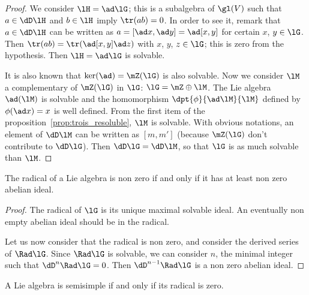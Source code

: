 \begin{proof}
We consider $\lH=\ad\lG$; this is a subalgebra of $\gl(V)$ such that $a\in\dD\lH$ and $b\in\lH$ imply $\tr(ab)=0$. In order to see it, remark that $a\in\dD\lH$ can be written as $a=[\ad x,\ad y]=\ad[x,y]$ for certain $x$, $y\in\lG$. Then $\tr(ab)=\tr(\ad[x,y]\ad z)$ with $x$, $y$, $z\in\lG$; this is zero from the hypothesis. Then $\lH=\ad\lG$ is solvable.

It is also known that $\ker(\ad)=\mZ(\lG)$ is also solvable. Now we consider $\lM$ a complementary of $\mZ(\lG)$ in $\lG$: $\lG=\mZ\oplus\lM$. The Lie algebra $\ad(\lM)$ is solvable and the homomorphism $\dpt{\phi}{\ad\lM}{\lM}$ defined by $\phi(\ad x)=x$ is well defined. From the first item of the proposition~\ref{prop:trois_resoluble}, $\lM$ is solvable. With obvious notations, an element of $\dD\lM$ can be written as $[m,m']$ (because $\mZ(\lG)$ don't contribute to $\dD\lG$). Then $\dD\lG=\dD\lM$, so that $\lG$ is as much solvable than $\lM$.
\end{proof}


\begin{lemma}
The radical of a Lie algebra is non zero if and only if it has at least non zero abelian ideal.
\label{lem:ss_ideal}
\end{lemma}

\begin{proof}
The radical of $\lG$ is its unique maximal solvable ideal. An eventually non empty abelian ideal should be in the radical.

Let us now consider that the radical is non zero, and consider the derived series of $\Rad\lG$. Since $\Rad\lG$ is solvable, we can consider $n$, the minimal integer such that $\dD^n\Rad\lG=0$. Then $\dD^{n-1}\Rad\lG$ is a non zero abelian ideal.
\end{proof}


\begin{theorem}     \label{ThoRadicalEquivSS}
A Lie algebra is semisimple if and only if its radical is zero.
\end{theorem}

